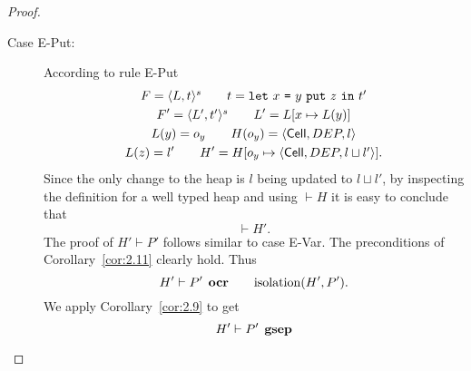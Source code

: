 \begin{proof}
\begin{description}
\begin{description}
\begin{description}
            \item[Case {\sc E-Put}:] According to rule {\sc E-Put}
              \begin{equation}
                \begin{gathered}
                  F = \mbox{$\langle L, t \rangle^s$} \quad\quad t = \mbox{\mdseries\texttt{let}~$x$~\texttt{=}~$\mbox{\mdseries$y$~\texttt{put}~$z$}$~\texttt{in}~$t'$} \\
                  F' = \mbox{$\langle L', t' \rangle^s$} \quad\quad L' = L[x \mapsto L(y)] \\
                  L(y) = o_y \quad\quad H(o_y) = \mbox{$\langle \mbox{$\mathsf{Cell}$}{}, DEP, l \rangle$} \\
                  L(z) = l' \quad\quad H' = H[o_y \mapsto \mbox{$\langle \mbox{$\mathsf{Cell}$}{}, DEP, l \sqcup
                  l' \rangle$}].
                \end{gathered}
              \end{equation}
              Since the only change to the heap is $l$ being updated to $l
              \sqcup l'$, by inspecting the definition for a well typed heap and
              using $\vdash H$ it is easy to conclude that
              \begin{equation}
                \vdash H'.
              \end{equation}
              The proof of $H' \vdash P'$ follows similar to case {\sc E-Var}.
              The preconditions of Corollary~\ref{cor:2.11} clearly hold. Thus 
              \begin{equation}
                H' \vdash P' \:\: \mbox{\bf ocr} \quad\quad \mbox{$\mathrm{isolation}$}(H', P').
              \end{equation}
              We apply Corollary~\ref{cor:2.9} to get
              \begin{equation}
                H' \vdash P' \:\: \mbox{\bf gsep}
              \end{equation}


\end{description}
\end{description}
\end{description}
\end{proof}

